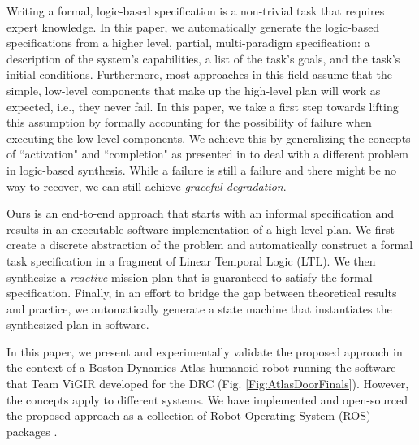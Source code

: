 Writing a formal, logic-based specification is a non-trivial task that requires expert knowledge.
In this paper, we automatically generate the logic-based specifications from a higher level, partial, multi-paradigm specification: a description of the system's capabilities, a list of the task's goals, and the task's initial conditions.
Furthermore, most approaches in this field assume that the simple, low-level components that make up the high-level plan will work as expected, i.e., they never fail.
In this paper, we take a first step towards lifting this assumption by formally accounting for the possibility of failure when executing the low-level components.
We achieve this by generalizing the concepts of ``activation" and ``completion" as presented in \cite{Vasu2013ICRA} to deal with a different problem in logic-based synthesis.
While a failure is still a failure and there might be no way to recover, we can still achieve \emph{graceful degradation}.

Ours is an end-to-end approach that starts with an informal specification and results in an executable software implementation of a high-level plan.
We first create a discrete abstraction of the problem and automatically construct a formal task specification in a fragment of Linear Temporal Logic (\textsc{LTL}).
We then synthesize a \emph{reactive} mission plan that is guaranteed to satisfy the formal specification.
Finally, in an effort to bridge the gap between theoretical results and practice, we automatically generate a state machine that instantiates the synthesized plan in software.

In this paper, we present and experimentally validate the proposed approach in the context of a Boston Dynamics Atlas humanoid robot running the software that Team ViGIR developed for the DRC (Fig. \ref{Fig:AtlasDoorFinals}).
However, the concepts apply to different systems.
We have implemented and open-sourced the proposed approach as a collection of Robot Operating System (ROS) packages \cite{ROS2009ICRA, ROS}.


